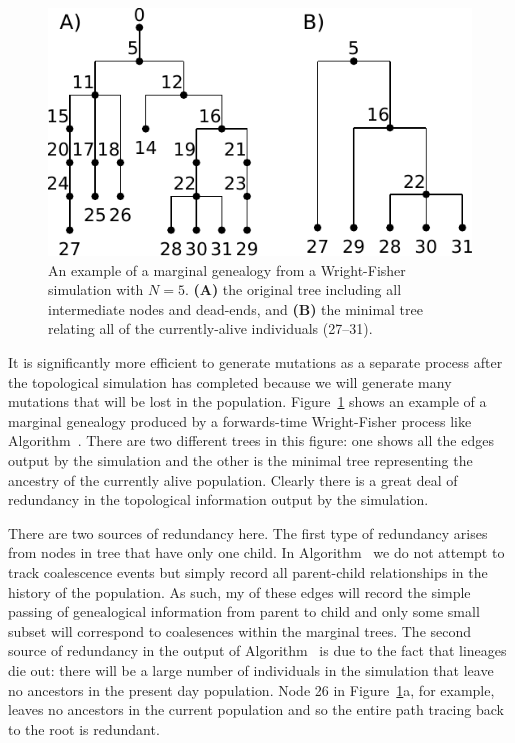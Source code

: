\documentclass{article}
\begin{document}
\begin{figure}
    \begin{center}
        \includegraphics{wf-before-after}
    \end{center}
    \caption{An example of a marginal genealogy from a Wright-Fisher simulation
    with $N=5$. \textbf{(A)} the original tree including all
    intermediate nodes and dead-ends, and \textbf{(B)} the minimal tree
    relating all of the currently-alive individuals (27--31).
    \label{fig:wf-trees}
    }
\end{figure}

It is significantly more efficient to generate mutations as a separate process
after the topological simulation has completed because we will generate many
mutations that will be lost in the population. Figure~\ref{fig:wf-trees} shows
an example of a marginal genealogy produced by a forwards-time Wright-Fisher
process like Algorithm~. There are two different trees in this
figure: one shows all the edges output by the simulation and the other
is the minimal tree representing the ancestry of the currently alive
population. Clearly there is a great deal of redundancy in the topological
information output by the simulation.

There are two sources of redundancy here. The first type of redundancy arises
from nodes in tree that have only one child. In Algorithm~ we do
not attempt to track coalescence events but simply record all parent-child
relationships in the history of the population. As such, my of these edges
will record the simple passing of genealogical information from parent to child
and only some small subset will correspond to coalesences within the marginal
trees. The second source of redundancy in the output of Algorithm~
is due to the fact that lineages die out: there will be a large number of
individuals in the simulation that leave no ancestors in the present day
population. Node 26 in Figure~\ref{fig:wf-trees}a, for example, leaves no
ancestors in the current population and so the entire path tracing back to
the root is redundant.
\end{document}
